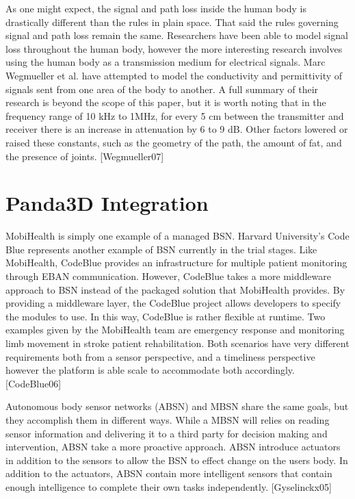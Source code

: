 As one might expect, the signal and path loss inside the human body is drastically different than the rules in plain space. That said the rules governing signal and path loss remain the same. Researchers have been able to model signal loss throughout the human body, however the more interesting research involves using the human body as a transmission medium for electrical signals. Marc Wegmueller et al. have attempted to model the conductivity and permittivity of signals sent from one area of the body to another. A full summary of their research is beyond the scope of this paper, but it is worth noting that in the frequency range of 10 kHz to 1MHz, for every 5 cm between the transmitter and receiver there is an increase in attenuation by 6 to 9 dB. Other factors lowered or raised these constants, such as the geometry of the path, the amount of fat, and the presence of joints. [Wegmueller07]

\section{Panda3D Integration}
MobiHealth is simply one example of a managed BSN. Harvard University's Code Blue represents another example of BSN currently in the trial stages. Like MobiHealth, CodeBlue provides an infrastructure for multiple patient monitoring through EBAN communication. However, CodeBlue takes a more middleware approach to BSN instead of the packaged solution that MobiHealth provides. By providing a middleware layer, the CodeBlue project allows developers to specify the modules to use. In this way, CodeBlue is rather flexible at runtime. Two examples given by the MobiHealth team are emergency response and monitoring limb movement in stroke patient rehabilitation. Both scenarios have very different requirements both from a sensor perspective, and a timeliness perspective however the platform is able scale to accommodate both accordingly. [CodeBlue06]

Autonomous body sensor networks (ABSN) and MBSN share the same goals, but they accomplish them in different ways. While a MBSN will relies on reading sensor information and delivering it to a third party for decision making and intervention, ABSN take a more proactive approach. ABSN introduce actuators in addition to the sensors to allow the BSN to effect change on the users body. In addition to the actuators, ABSN contain more intelligent sensors that contain enough intelligence to complete their own tasks independently. [Gyselinckx05]

